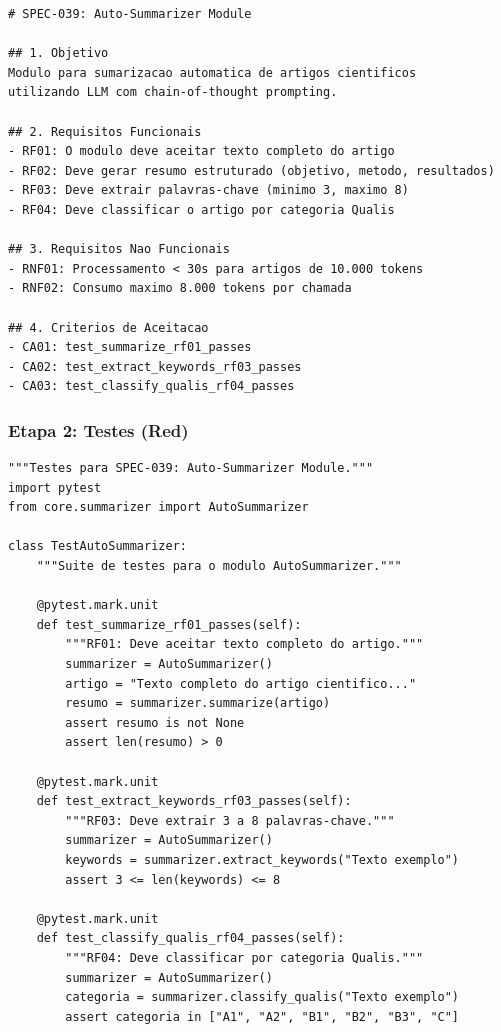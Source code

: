 \begin{lstlisting}[style=pythonstyle, caption={SPEC-039: Auto-Summarizer},
                   label={lst:spec-example}]
# SPEC-039: Auto-Summarizer Module

## 1. Objetivo
Modulo para sumarizacao automatica de artigos cientificos
utilizando LLM com chain-of-thought prompting.

## 2. Requisitos Funcionais
- RF01: O modulo deve aceitar texto completo do artigo
- RF02: Deve gerar resumo estruturado (objetivo, metodo, resultados)
- RF03: Deve extrair palavras-chave (minimo 3, maximo 8)
- RF04: Deve classificar o artigo por categoria Qualis

## 3. Requisitos Nao Funcionais
- RNF01: Processamento < 30s para artigos de 10.000 tokens
- RNF02: Consumo maximo 8.000 tokens por chamada

## 4. Criterios de Aceitacao
- CA01: test_summarize_rf01_passes
- CA02: test_extract_keywords_rf03_passes
- CA03: test_classify_qualis_rf04_passes
\end{lstlisting}

\subsubsection{Etapa 2: Testes (Red)}

\begin{lstlisting}[style=pythonstyle, caption={Testes da SPEC-039},
                   label={lst:spec-tests}]
"""Testes para SPEC-039: Auto-Summarizer Module."""
import pytest
from core.summarizer import AutoSummarizer

class TestAutoSummarizer:
    """Suite de testes para o modulo AutoSummarizer."""

    @pytest.mark.unit
    def test_summarize_rf01_passes(self):
        """RF01: Deve aceitar texto completo do artigo."""
        summarizer = AutoSummarizer()
        artigo = "Texto completo do artigo cientifico..."
        resumo = summarizer.summarize(artigo)
        assert resumo is not None
        assert len(resumo) > 0

    @pytest.mark.unit
    def test_extract_keywords_rf03_passes(self):
        """RF03: Deve extrair 3 a 8 palavras-chave."""
        summarizer = AutoSummarizer()
        keywords = summarizer.extract_keywords("Texto exemplo")
        assert 3 <= len(keywords) <= 8

    @pytest.mark.unit
    def test_classify_qualis_rf04_passes(self):
        """RF04: Deve classificar por categoria Qualis."""
        summarizer = AutoSummarizer()
        categoria = summarizer.classify_qualis("Texto exemplo")
        assert categoria in ["A1", "A2", "B1", "B2", "B3", "C"]
\end{lstlisting}

